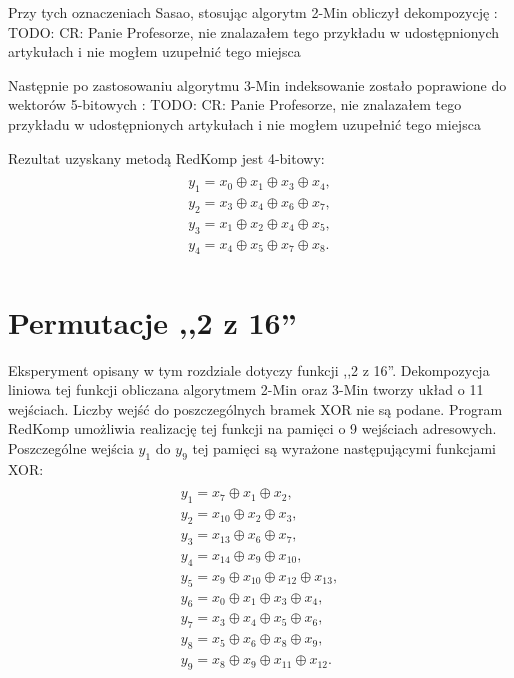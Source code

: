 


Przy tych oznaczeniach Sasao, stosując algorytm 2-Min obliczył dekompozycję \cite{sasao-s-min}:
TODO: CR: Panie Profesorze, nie znalazałem tego przykładu w udostępnionych artykułach i nie mogłem uzupełnić tego miejsca

Następnie po zastosowaniu algorytmu 3-Min indeksowanie zostało poprawione do wektorów 5-bitowych \cite{sasao-s-min}:
TODO: CR: Panie Profesorze, nie znalazałem tego przykładu w udostępnionych artykułach i nie mogłem uzupełnić tego miejsca

Rezultat uzyskany metodą RedKomp jest 4-bitowy:
\begin{multline} \\
y_1 = x_0 \oplus x_1 \oplus x_3 \oplus x_4, \\
y_2 = x_3 \oplus x_4 \oplus x_6 \oplus x_7, \\
y_3 = x_1 \oplus x_2 \oplus x_4 \oplus x_5, \\
y_4 = x_4 \oplus x_5 \oplus x_7 \oplus x_8. \\
\end{multline}

\section{Permutacje ,,2 z 16''}

Eksperyment opisany w tym rozdziale dotyczy funkcji ,,2 z 16''.
Dekompozycja liniowa tej funkcji obliczana algorytmem 2-Min oraz 3-Min \cite{sasao-s-min} tworzy układ o 11 wejściach.
Liczby wejść do poszczególnych bramek XOR nie są podane.
Program RedKomp umożliwia realizację tej funkcji na pamięci o 9 wejściach adresowych.
Poszczególne wejścia $y_1$ do $y_9$ tej pamięci są wyrażone następującymi funkcjami XOR:
\begin{multline} \\
y_1 = x_7 \oplus x_1 \oplus x_2, \\
y_2 = x_{10} \oplus x_2 \oplus x_3, \\
y_3 = x_{13} \oplus x_6 \oplus x_7, \\
y_4 = x_{14} \oplus x_9 \oplus x_{10}, \\
y_5 = x_9 \oplus x_{10} \oplus x_{12} \oplus x_{13}, \\
y_6 = x_0 \oplus x_1 \oplus x_3 \oplus x_4, \\
y_7 = x_3 \oplus x_4 \oplus x_5 \oplus x_6, \\
y_8 = x_5 \oplus x_6 \oplus x_8 \oplus x_9, \\
y_9 = x_8 \oplus x_9 \oplus x_{11} \oplus x_{12}. \\
\end{multline}


